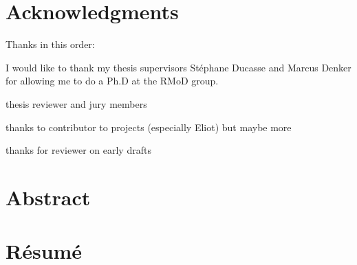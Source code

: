 \documentclass[a4paper,12pt,twoside]{includes/ThesisStyle}
\begin{document}

\dominitoc


\cleardoublepage

\section*{Acknowledgments}

Thanks in this order:

I would like to thank my thesis supervisors St\'ephane Ducasse and Marcus Denker for allowing me to do a Ph.D at the RMoD group.

thesis reviewer and jury members

thanks to contributor to projects (especially Eliot) but maybe more

thanks for reviewer on early drafts

\cleardoublepage

\section*{Abstract}



\cleardoublepage

\section*{R\'esum\'e}

\tableofcontents
\listoffigures
\listoftables

\mainmatter












\appendix







\end{document}
